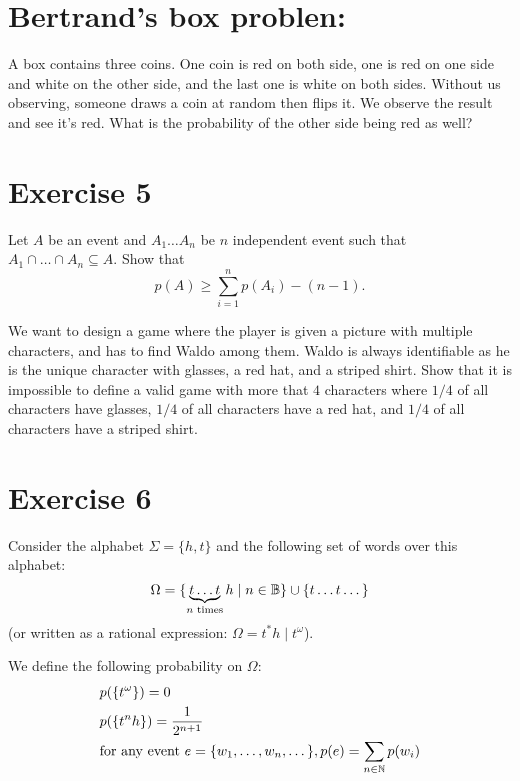 \documentclass{article}
\begin{document}
\section*{Bertrand's box problen:}
A box contains three coins. One coin is red on both side, one is red on one side and white on the other side, and the last one is white on both sides. Without us observing, someone draws a coin at random then flips it. We observe the result and see it's red. What is the probability of the other side being red as well?


\section*{Exercise 5}
Let $A$ be an event and $A_1 \dots A_n$ be $n$ independent event such that $A_1 \cap \dots \cap A_n \subseteq A$. Show that
\[p(A) \ge \sum^n_{i=1} p(A_i) - (n-1).\]

We want to design a game where the player is given a picture with multiple characters, and has to find Waldo among them. Waldo is always identifiable as he is the unique character with glasses, a red hat, and a striped shirt. Show that it is impossible to define a valid game with more that $4$ characters where $1/4$ of all characters have glasses, $1/4$ of all characters have a red hat, and $1/4$ of all characters have a striped shirt.

\section*{Exercise 6}
Consider the alphabet $\Sigma = \{h, t\}$ and the following set of words over this alphabet:
\[ \Omega = \{ \underbrace{t\dots t}_{n \textnormal{ times}}h \mid n \in \mathbb{B} \} \cup \{ t \dots t \dots \} \]
(or written as a rational expression: $\Omega = t^*h \mid t^{\omega}$).

We define the following probability on $\Omega$:
\[ \begin{aligned}
  &p(\{t^{\omega}\}) = 0\\
  &p(\{t^n h\}) =  \frac{1}{2^{n+1}} \\
  &\textnormal{for any event } e = \{w_1, \dots, w_n, \dots \}, p(e) = \sum_{n \in \mathbb{N}} p(w_i)
\end{aligned} \]
\end{document}
